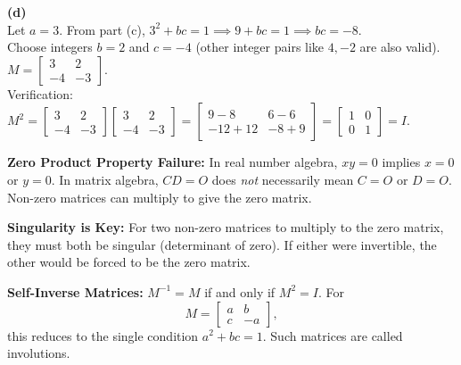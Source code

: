 \begin{solution}
\medskip
\textbf{(d)} \\
Let $a=3$. From part (c), $3^2 + bc = 1 \implies 9 + bc = 1 \implies bc = -8$. \\
Choose integers $b = 2$ and $c = -4$ (other integer pairs like $4, -2$ are also valid). \\
$M = \begin{bmatrix} 3 & 2 \\ -4 & -3 \end{bmatrix}$. \\
Verification: \\
$M^2 = \begin{bmatrix} 3 & 2 \\ -4 & -3 \end{bmatrix} \begin{bmatrix} 3 & 2 \\ -4 & -3 \end{bmatrix} = \begin{bmatrix} 9-8 & 6-6 \\ -12+12 & -8+9 \end{bmatrix} = \begin{bmatrix} 1 & 0 \\ 0 & 1 \end{bmatrix} = I$.
\end{solution}

\begin{takeaways}
\item \textbf{Zero Product Property Failure:} In real number algebra, $xy=0$ implies $x=0$ or $y=0$. In matrix algebra, $CD=O$ does \textit{not} necessarily mean $C=O$ or $D=O$. Non-zero matrices can multiply to give the zero matrix.
\item \textbf{Singularity is Key:} For two non-zero matrices to multiply to the zero matrix, they must both be singular (determinant of zero). If either were invertible, the other would be forced to be the zero matrix.
\item \textbf{Self-Inverse Matrices:} $M^{-1}=M$ if and only if $M^2=I$. For
\[
M=\begin{bmatrix}a&b\\c&-a\end{bmatrix},
\]
this reduces to the single condition $a^2+bc=1$. Such matrices are called involutions.
\end{takeaways}


